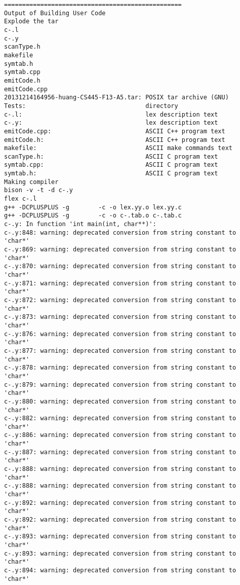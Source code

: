 \documentclass[12pt]{book}
\begin{document}
\lstset{language=java,label= ,caption= ,numbers=none}
\begin{lstlisting}
=================================================
Output of Building User Code
Explode the tar
c-.l
c-.y
scanType.h
makefile
symtab.h
symtab.cpp
emitCode.h
emitCode.cpp
20131214164956-huang-CS445-F13-A5.tar: POSIX tar archive (GNU)
Tests:                                 directory
c-.l:                                  lex description text
c-.y:                                  lex description text
emitCode.cpp:                          ASCII C++ program text
emitCode.h:                            ASCII C++ program text
makefile:                              ASCII make commands text
scanType.h:                            ASCII C program text
symtab.cpp:                            ASCII C program text
symtab.h:                              ASCII C program text
Making compiler
bison -v -t -d c-.y  
flex c-.l
g++ -DCPLUSPLUS -g        -c -o lex.yy.o lex.yy.c
g++ -DCPLUSPLUS -g        -c -o c-.tab.o c-.tab.c
c-.y: In function 'int main(int, char**)':
c-.y:848: warning: deprecated conversion from string constant to 'char*'
c-.y:869: warning: deprecated conversion from string constant to 'char*'
c-.y:870: warning: deprecated conversion from string constant to 'char*'
c-.y:871: warning: deprecated conversion from string constant to 'char*'
c-.y:872: warning: deprecated conversion from string constant to 'char*'
c-.y:873: warning: deprecated conversion from string constant to 'char*'
c-.y:876: warning: deprecated conversion from string constant to 'char*'
c-.y:877: warning: deprecated conversion from string constant to 'char*'
c-.y:878: warning: deprecated conversion from string constant to 'char*'
c-.y:879: warning: deprecated conversion from string constant to 'char*'
c-.y:880: warning: deprecated conversion from string constant to 'char*'
c-.y:882: warning: deprecated conversion from string constant to 'char*'
c-.y:886: warning: deprecated conversion from string constant to 'char*'
c-.y:887: warning: deprecated conversion from string constant to 'char*'
c-.y:888: warning: deprecated conversion from string constant to 'char*'
c-.y:888: warning: deprecated conversion from string constant to 'char*'
c-.y:892: warning: deprecated conversion from string constant to 'char*'
c-.y:892: warning: deprecated conversion from string constant to 'char*'
c-.y:893: warning: deprecated conversion from string constant to 'char*'
c-.y:893: warning: deprecated conversion from string constant to 'char*'
c-.y:894: warning: deprecated conversion from string constant to 'char*'

\end{lstlisting}
\end{document}
